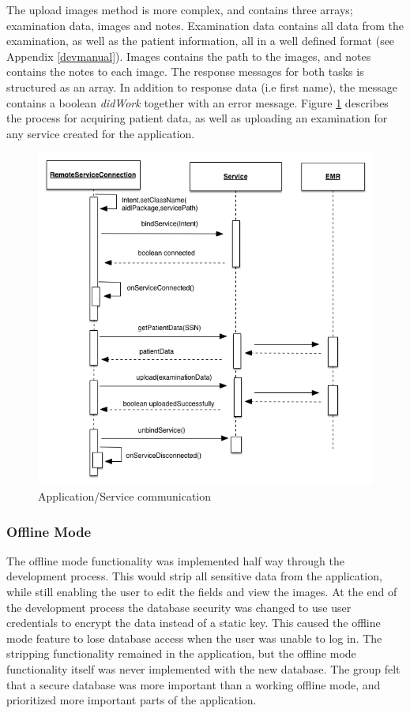 The upload images method is more complex, and contains three arrays; examination data, images and notes. Examination data contains all data from the examination, as well as the patient information, all in a well defined format (see Appendix \ref{devmanual}).
Images contains the path to the images, and notes contains the notes to each image.
\noindent
The response messages for both tasks is structured as an array. In addition to response data (i.e first name), the message contains a boolean \emph{didWork} together with an error message. Figure \ref{fig:service} describes the process for acquiring patient data, as well as uploading an examination for any service created for the application.   

\begin{figure}[H]
\centering
\includegraphics[scale=0.5]{img/sequence_service.png}
\caption{Application/Service communication}
\label{fig:service}
\end{figure}


\subsubsection{Offline Mode}
The offline mode functionality was implemented half way through the development process. This would strip all sensitive data from the application, while still enabling the user to edit the fields and view the images.
\noindent
At the end of the development process the database security was changed to use user credentials to encrypt the data instead of a static key. This caused the offline mode feature to lose database access when the user was unable to log in. The stripping functionality remained in the application, but the offline mode functionality itself was never implemented with the new database. 
\noindent
The group felt that a secure database was more important than a working offline mode, and prioritized more important parts of the application.

